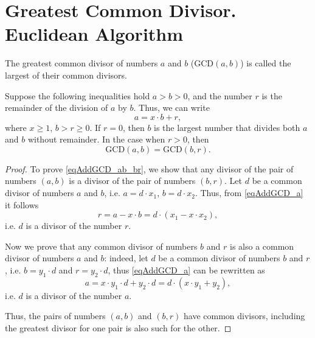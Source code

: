 \section{Greatest Common Divisor. Euclidean Algorithm}
\label{AddEuclidean}
\begin{definition}
The greatest common divisor of numbers $a$ and $b$ ($\mbox{GCD}\left(a,
b\right)$) is called the largest of their common divisors.
\label{defAddGCD}
\end{definition}

\begin{theorem}
Suppose the following inequalities hold
$a > b > 0$, and the number $r$ is the remainder of the division of $a$ by
$b$. Thus, we can write 
\begin{equation}
a = x \cdot b + r,
\label{eqAddGCD_a}
\end{equation}
where $x \ge 1$, $b > r \ge 0$. If $r=0$, then $b$ is the largest number that divides both $a$ and $b$ without remainder. In the case when $r > 0$, then
\begin{equation}
\mbox{GCD}\left(a, b\right) = \mbox{GCD}\left(b, r\right).
\label{eqAddGCD_ab_br}
\end{equation}
\end{theorem}

\begin{proof}
To prove \eqref{eqAddGCD_ab_br}, we show that any divisor
of the pair of numbers $\left(a,b\right)$  is a divisor of the pair of numbers
$\left(b,r\right)$. Let $d$ be a common divisor of numbers $a$ and
$b$, i.e. $a = d \cdot x_1$, $b = d \cdot x_2$. Thus, from \eqref{eqAddGCD_a} it follows
\begin{equation}
r = a - x \cdot b = 
d \cdot \left( x_1 - x \cdot x_2 \right),
\nonumber
\end{equation}
i.e. $d$ is a divisor of the number $r$.

Now we prove that any common divisor of numbers $b$ and $r$ is also a common
divisor of numbers $a$ and $b$: indeed, let $d$ be a common divisor
of numbers $b$ and $r$, i.e. $b = y_1 \cdot d$ and  $r = y_2 \cdot d$,
thus \eqref{eqAddGCD_a} can be rewritten as
\begin{equation}
a = x \cdot y_1 \cdot d + y_2 \cdot d = d \cdot \left( x \cdot y_1 +
y_2 \right),
\nonumber
\end{equation}
i.e. $d$ is a divisor of the number $a$.

Thus, the pairs of numbers  $\left(a,b\right)$  and $\left(b,r\right)$
have common divisors, including the greatest divisor for one
pair is also such for the other.  
\end{proof}


